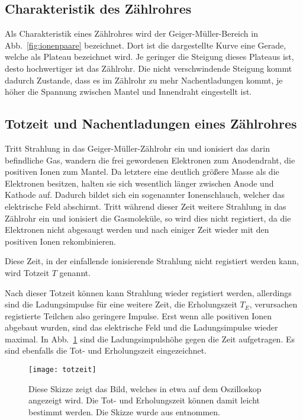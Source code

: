 \subsection{Charakteristik des Zählrohres}
%

Als Charakteristik eines Zählrohres wird der Geiger-Müller-Bereich in
Abb.~\ref{fig:ionenpaare} bezeichnet. Dort ist die dargestellte Kurve
eine Gerade, welche als Plateau bezeichnet wird. Je geringer die
Steigung dieses Plateaus ist, desto hochwertiger ist das Zählrohr. Die
nicht verschwindende Steigung kommt dadurch Zustande, dass es im
Zählrohr zu mehr Nachentladungen kommt, je höher die Spannung zwischen
Mantel und Innendraht eingestellt ist.
%
\subsection{Totzeit und Nachentladungen eines Zählrohres}
%

Tritt Strahlung in das Geiger-Müller-Zählrohr ein und ionisiert das
darin befindliche Gas, wandern die frei gewordenen Elektronen zum
Anodendraht, die positiven Ionen zum Mantel. Da letztere eine deutlich
größere Masse als die Elektronen besitzen, halten sie sich wesentlich
länger zwischen Anode und Kathode auf. Dadurch bildet sich ein
sogenannter Ionenschlauch, welcher das elektrische Feld abschirmt. Tritt
während dieser Zeit weitere Strahlung in das Zählrohr ein und ionisiert
die Gasmoleküle, so wird dies nicht registiert, da die Elektronen nicht
abgesaugt werden und nach einiger Zeit wieder mit den positiven Ionen
rekombinieren.

Diese Zeit, in der einfallende ionisierende Strahlung nicht registiert
werden kann, wird Totzeit $T$ genannt.

Nach dieser Totzeit können kann Strahlung wieder registiert werden,
allerdings sind die Ladungsimpulse für eine weitere Zeit, die
Erholungszeit $T_E$, verursachen registierte Teilchen also geringere
Impulse.  Erst wenn alle positiven Ionen abgebaut wurden, sind das
elektrische Feld und die Ladungsimpulse wieder maximal.  In
Abb.~\ref{fig:totzeit} sind die Ladungsimpulshöhe gegen die Zeit
aufgetragen. Es sind ebenfalls die Tot- und Erholungszeit eingezeichnet.
%
\begin{figure}
  \centering
  \texttt{[image: totzeit]}
  \caption{Diese Skizze zeigt das Bild, welches in etwa
               auf dem Oszilloskop angezeigt wird. Die Tot- und
                Erholungszeit können damit leicht bestimmt werden.
                Die Skizze wurde aus \textcite{v703} entnommen.}
  \label{fig:totzeit}
\end{figure}
%

